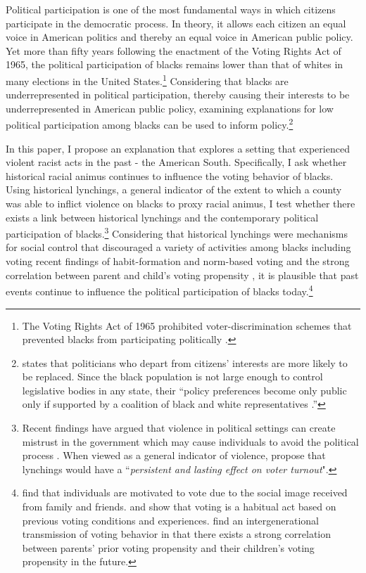 \documentclass[AEJ, finalmode]{AEA}
\begin{document}
\vspace{5mm}
Political participation is one of the most fundamental ways in which citizens participate in the democratic process. In theory, it allows each citizen an equal voice in American politics and thereby an equal voice in American public policy. Yet more than fifty years following the enactment of the Voting Rights Act of 1965, the political participation of blacks remains lower than that of whites in many elections in the United States.\footnote{The Voting Rights Act of 1965 prohibited voter-discrimination schemes that prevented blacks from participating politically \cite{christopher1965constitutionality}.} Considering that blacks are underrepresented in political participation, thereby causing their interests to be underrepresented in American public policy, examining explanations for low political participation among blacks can be used to inform policy.\footnote{ states that politicians who depart from citizens’ interests are more likely to be replaced. Since the black population is not large enough to control legislative bodies in any state, their “policy preferences become only public only if supported by a coalition of black and white representatives \cite{bullock1981policy}.”}

In this paper, I propose an explanation that explores a setting that experienced violent racist acts in the past - the American South. Specifically, I ask whether historical racial animus continues to influence the voting behavior of blacks. Using historical lynchings, a general indicator of the extent to which a county was able to inflict violence on blacks \cite{jones2017political} to proxy racial animus, I test whether there exists a link between historical lynchings and the contemporary political participation of blacks.\footnote{Recent findings have argued that violence in political settings can create mistrust in the government which may cause individuals to avoid the political process \cite{blanco2013impact,jones2017political}. When viewed as a general indicator of violence,  propose that lynchings would have a ``\textit{persistent and lasting effect on voter turnout}".} Considering that historical lynchings were mechanisms for social control that discouraged a variety of activities among blacks including voting \cite{dickerson2003reconstruction,cook_logan_parman} recent findings of habit-formation and norm-based voting \cite{gerber2003voting,dellavigna2016voting,fujiwara2016habit} and the strong correlation between parent and child's voting propensity \cite{akee2018}, it is plausible that past events continue to influence the political participation of blacks today.\footnote{  find that individuals are motivated to vote due to the social image received from family and friends.  and  show that voting is a habitual act based on previous voting conditions and experiences.  find an intergenerational transmission of voting behavior in that there exists a strong correlation between parents' prior voting propensity and their children's voting propensity in the future.} 
\end{document}
